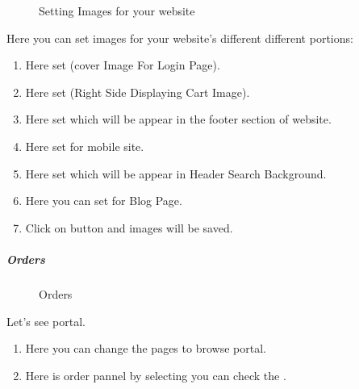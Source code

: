 \documentclass[a4paper,10pt,english]{report}
\begin{document}
\begin{figure}[htbp]
\centering
\capstart

\noindent{}
\caption{Setting Images for your website}\label{\detokenize{configure:id16}}\label{\detokenize{configure:id8}}\end{figure}

Here you can set images for your website’s different different portions:
\begin{enumerate}
\def\theenumi{\arabic{enumi}}
\def\labelenumi{\theenumi .}
\makeatletter\def\p@enumii{\p@enumi \theenumi .}\makeatother
\item {} 
Here set  (cover Image For Login Page).

\item {} 
Here set  (Right Side Displaying Cart Image).

\item {} 
Here set  which will be appear in the footer section of website.

\item {} 
Here set  for mobile site.

\item {} 
Here set  which will be appear in Header Search Background.

\item {} 
Here you can set  for Blog Page.

\item {} 
Click on  button and images will be saved.

\end{enumerate}


\subparagraph{Orders}
\label{\detokenize{orders:orders}}\label{\detokenize{orders::doc}}
\begin{figure}[htbp]
\centering
\capstart

\noindent{}
\caption{Orders}\label{\detokenize{orders:id4}}\label{\detokenize{orders:id1}}\end{figure}

Let’s see  portal.
\begin{enumerate}
\def\theenumi{\arabic{enumi}}
\def\labelenumi{\theenumi .}
\makeatletter\def\p@enumii{\p@enumi \theenumi .}\makeatother
\item {} 
Here you can change the pages to browse  portal.

\item {} 
Here is order pannel by selecting  you can check the  .

\end{enumerate}
\end{document}
